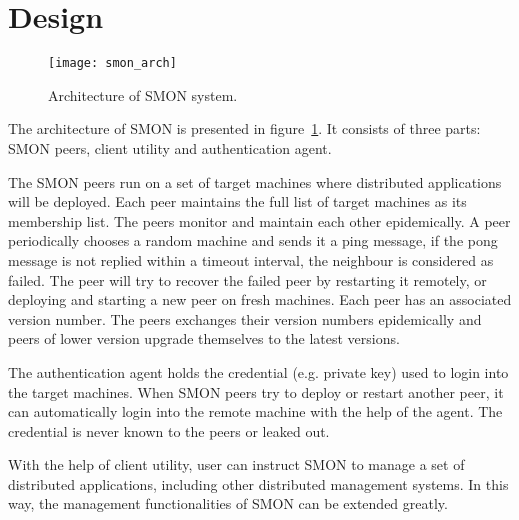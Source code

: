 \section{Design}
\label{sec:design}

\begin{figure}
\centering
\texttt{[image: smon\_arch]}
\caption{Architecture of SMON system.}
\label{fig:smon_arch}
\end{figure}

The architecture of SMON is presented in
figure~\ref{fig:smon_arch}.  It consists of three parts: SMON
peers, client utility and authentication agent.

The SMON peers run on a set of target machines where
distributed applications will be deployed. Each peer
maintains the full list of target machines as its membership
list. The peers monitor and maintain each other
epidemically. A peer periodically chooses a random machine
and sends it a ping message, if the pong message is not
replied within a timeout interval, the neighbour is
considered as failed. The peer will try to recover the
failed peer by restarting it remotely, or deploying and
starting a new peer on fresh machines. Each peer has an
associated version number. The peers exchanges their version
numbers epidemically and peers of lower version upgrade
themselves to the latest versions.

The authentication agent holds the credential (e.g. private
key) used to login into the target machines. When
SMON peers try to deploy or restart another peer, it can
automatically login into the remote machine with the help of
the agent. The credential is never known to the peers or
leaked out.

With the help of client utility, user can instruct SMON to
manage a set of distributed applications, including other
distributed management systems. In this way, the management
functionalities of SMON can be extended greatly.

